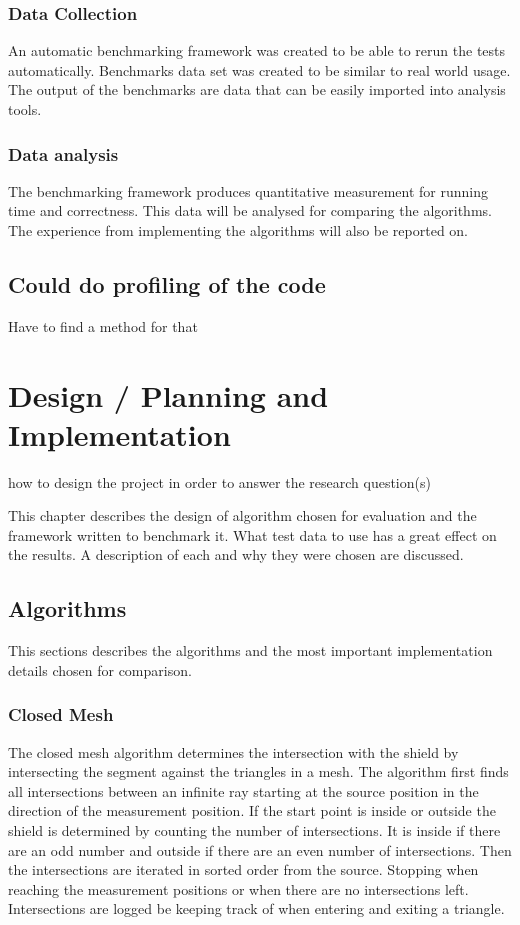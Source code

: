 \documentclass[11pt,twoside,a4paper]{report}
\begin{document}
\subsection{Data Collection}
An automatic benchmarking framework was created to be able to rerun the tests automatically. Benchmarks data set was created to be similar to real world usage. The output of the benchmarks are data that can be easily imported into analysis tools.

\subsection{Data analysis}
The benchmarking framework produces quantitative measurement for running time and correctness. This data will be analysed for comparing the algorithms. The experience from implementing the algorithms will also be reported on.

\section{Could do profiling of the code}
Have to find a method for that


\chapter{Design / Planning and Implementation}
how to design the project in order to answer the research question(s)

This chapter describes the design of algorithm chosen for evaluation and the framework written to benchmark it. What test data to use has a great effect on the results. A description of each and why they were chosen are discussed.
\section{Algorithms}
This sections describes the algorithms and the most important implementation details chosen for comparison. 

\subsection{Closed Mesh}
The closed mesh algorithm determines the intersection with the shield by intersecting the segment against the triangles in a mesh. The algorithm first finds all intersections between an infinite ray starting at the source position in the direction of the measurement position. If the start point is inside or outside the shield is determined by counting the number of intersections. It is inside if there are an odd number and outside if there are an even number of intersections. Then the intersections are iterated in sorted order from the source. Stopping when reaching the measurement positions or when there are no intersections left. Intersections are logged be keeping track of when entering and exiting a triangle.
\end{document}
